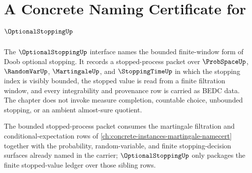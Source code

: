 \chapter{A Concrete Naming Certificate for $\OptionalStoppingUp$}
\label{ch:concrete-instances-optionalstopping-namecert}

The $\OptionalStoppingUp$ interface names the bounded finite-window form of Doob optional stopping. It records a stopped-process packet over $\ProbSpaceUp$, $\RandomVarUp$, $\MartingaleUp$, and $\StoppingTimeUp$ in which the stopping index is visibly bounded, the stopped value is read from a finite filtration window, and every integrability and provenance row is carried as BEDC data. The chapter does not invoke measure completion, countable choice, unbounded stopping, or an ambient almost-sure quotient.

The bounded stopped-process packet consumes the martingale filtration and conditional-expectation rows of \autoref{ch:concrete-instances-martingale-namecert} together with the probability, random-variable, and finite stopping-decision surfaces already named in the carrier; $\OptionalStoppingUp$ only packages the finite stopped-value ledger over those sibling rows.


